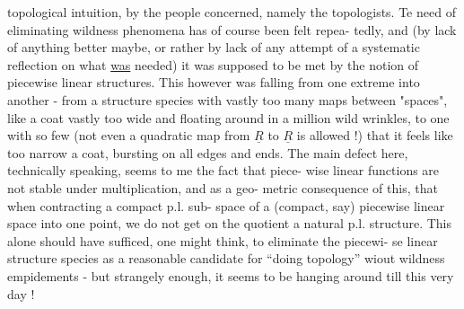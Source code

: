 
topological intuition,  by the people  concerned,  namely the topologists.
Te need of eliminating wildness phenomena has of course been felt repea-%
tedly,  and (by lack of anything better maybe,  or rather by lack of any
attempt of a systematic reflection on what \uline{was} needed) it was supposed
to be met by the notion of piecewise linear structures.  This however
was falling from one extreme into another  -  from a structure species
with vastly too many maps between "spaces",  like a coat vastly too wide
and floating around in a million wild wrinkles,  to one with so few
(not even a quadratic map from $\underline{R}$ to $\underline{R}$ is allowed !) that it feels like
too narrow a coat,  bursting  on all edges and ends.  The main defect
here,  technically speaking,  seems to me the fact that  piece-%
wise linear functions are not stable under multiplication,  and as a geo-%
metric consequence of this,  that when contracting a compact p.l. sub-%
space of a (compact, say) piecewise linear space into one point,  we do
not get on the quotient   a natural p.l. structure.  This
alone should have sufficed,  one might think,  to eliminate the piecewi-%
se linear structure species as a reasonable candidate for 
``doing topology'' wiout wildness empidements  -  but strangely enough,
it seems to be hanging around till this very day !

